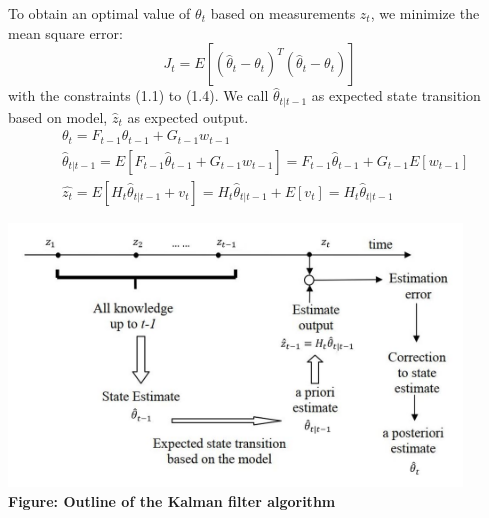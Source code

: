 \documentclass[a4 paper]{article}
\begin{document}
To obtain an optimal value of $\theta_t$ based on measurements $z_t$, we minimize the mean square error:
\begin{equation}
    J_t=E[(\hat{\theta}_t-\theta_t)^T(\hat{\theta}_t-\theta_t)]
\end{equation}
with the constraints (1.1) to (1.4).
We call $\hat{\theta}_{t|t-1}$ as expected state transition based on model, $\hat{z}_t$ as expected output.
\begin{equation}
    \begin{split}
        &\theta_t=F_{t-1}\theta_{t-1}+G_{t-1}w_{t-1}\\
        &\hat{\theta}_{t|t-1}=E[F_{t-1}\hat{\theta}_{t-1}+G_{t-1}w_{t-1}]=F_{t-1}\hat{\theta}_{t-1}+G_{t-1}E[w_{t-1}]\\
        &\hat{z_t}=E[H_t\hat{\theta}_{t|t-1}+v_t]=H_t\hat{\theta}_{t|t-1}+E[v_t]=H_{t}\hat{\theta}_{t|t-1}
    \end{split}
\end{equation}
\begin{center}
    \includegraphics[height=7cm]{figure/kalman_filter_flowchart_new.JPG}\\
    \textbf{Figure: Outline of the Kalman filter algorithm}
\end{center}
\end{document}
